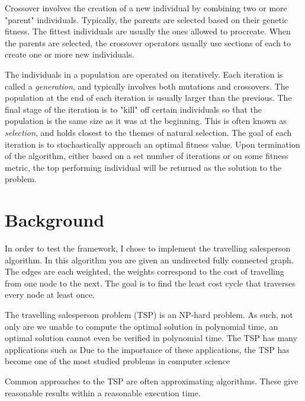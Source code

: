 \documentclass[10pt,letterpaper]{article}
\begin{document}
Crossover involves the creation of a new individual by combining two or more "parent" individuals. Typically, the parents are selected based on their genetic fitness. The fittest individuals are usually the ones allowed to procreate. When the parents are selected, the crossover operators usually use sections of each to create one or more new individuals.  

The individuals in a population are operated on iteratively. Each iteration is called a \textit{generation}, and typically involves both mutations and crossovers. The population at the end of each iteration is usually larger than the previous. The final stage of the iteration is to "kill" off certain individuals so that the population is the same size as it was at the beginning. This is often known as \textit{selection}, and holds closest to the themes of natural selection. The goal of each iteration is to stochastically approach an optimal fitness value. Upon termination of the algorithm, either based on a set number of iterations or on some fitness metric, the top performing individual will be returned as the solution to the problem.


\section{Background}
In order to test the framework, I chose to implement the travelling salesperson algorithm. In this algorithm you are given an undirected fully connected graph. The edges are each weighted, the weights correspond to the cost of travelling from one node to the next. The goal is to find the least cost cycle that traverses every node at least once. 

The travelling salesperson problem (TSP) is an NP-hard problem. As such, not only are we unable to compute the optimal solution in polynomial time, an optimal solution cannot even be verified in polynomial time. %
The TSP has many applications such as %
Due to the importance of these applications, the TSP has become one of the most studied problems in computer science %

Common approaches to the TSP are often approximating algorithms. These give reasonable results within a reasonable execution time. %
\end{document}
